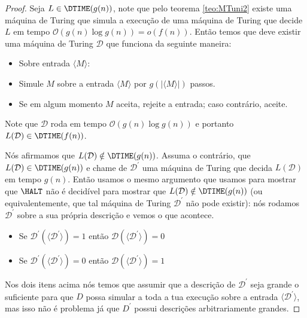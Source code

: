 \begin{proof}

Seja $L \in \DTIME(g(n))$, note que pelo teorema \ref{teo:MTuni2} existe uma máquina de Turing que simula a execução de uma máquina de Turing que decide $L$ em tempo $\mathcal{O}(g(n)\log g(n)) = o(f(n))$. Então temos que deve existir uma máquina de Turing $\mathcal{D}$ que funciona da seguinte maneira:

\begin{itemize}

\item Sobre entrada $\langle M \rangle$:

\item Simule $M$ sobre a entrada $\langle M \rangle$ por $g(\lvert \langle M \rangle \rvert)$ passos.

\item Se em algum momento $M$ aceita, rejeite a entrada; caso contrário, aceite.

\end{itemize} 

Note que $\mathcal{D}$ roda em tempo $\mathcal{O}(g(n)\log g(n))$ e portanto $L(\mathcal{D}) \in \DTIME(f(n))$.

Nós afirmamos que $L(\mathcal{D}) \notin \DTIME(g(n))$. Assuma o contrário, que $L(\mathcal{D}) \in \DTIME(g(n))$ e chame de $\mathcal{D}^{\prime}$ uma máquina de Turing que decida $L(\mathcal{D})$ em tempo $g(n)$. Então usamos o mesmo argumento que usamos para mostrar que $\HALT$ não é decidível para mostrar que $L(\mathcal{D}) \notin \DTIME(g(n))$ (ou equivalentemente, que tal máquina de Turing $\mathcal{D}^{\prime}$ não pode existir): nós rodamos $\mathcal{D}^{\prime}$ sobre a sua própria descrição e vemos o que acontece.

\begin{itemize}

\item Se $\mathcal{D}^{\prime}(\langle \mathcal{D}^{\prime} \rangle) = 1$ então $\mathcal{D}(\langle \mathcal{D}^{\prime} \rangle) = 0$

\item Se $\mathcal{D}^{\prime}(\langle \mathcal{D}^{\prime} \rangle) = 0$ então $\mathcal{D}(\langle \mathcal{D}^{\prime} \rangle) = 1$

\end{itemize}

Nos dois itens acima nós temos que assumir que a descrição de $\mathcal{D}^{\prime}$ seja grande o suficiente para que $D$ possa simular a toda a tua execução sobre a entrada $\langle \mathcal{D}^{\prime} \rangle$, mas isso não é problema já que $D^{\prime}$ possui descrições arbitrariamente grandes.

\end{proof}

